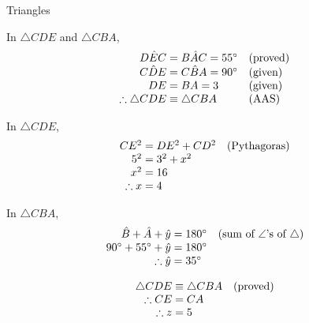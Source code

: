 \begin{wex}{Triangles}
{In $\triangle CDE$ and $\triangle CBA$,
\begin{equation*}
  \begin{array}{r@{\;}l@{\quad}l}
    D\hat{E}C &= B\hat{A}C = 55^{\circ} & \mbox{(proved)} \\
    C\hat{D}E &= C\hat{B}A = 90^{\circ} & \mbox{(given)} \\
           DE &= BA = 3                & \mbox{(given)} \\
    \therefore \triangle{CDE} &\equiv \triangle {CBA} & \mbox{(AAS)} 
  \end{array}
\end{equation*}

In $\triangle CDE$,
\begin{equation*}
  \begin{array}{r@{\;}l@{\quad}l}
    CE^{2} &= DE^{2} + CD^{2} & \mbox{(Pythagoras)} \\
    5^{2} &= 3^{2} + x^{2} &  \\
    x^{2} &= 16 & \\
    \therefore x &= 4 &
  \end{array}
\end{equation*}

In $\triangle CBA$,
\begin{equation*}
  \begin{array}{r@{\;}l@{\quad}l}
    \hat{B} + \hat{A} + \hat{y} &= 180^{\circ} & \mbox{(sum of $\angle$'s of $\triangle$)} \\
    90^{\circ} + 55^{\circ} + \hat{y} &= 180^{\circ} & \\
    \therefore \hat{y} &= 35^{\circ} &
  \end{array}
\end{equation*}

\begin{equation*}
  \begin{array}{r@{\;}l@{\quad}l}
    \triangle CDE &\equiv \triangle CBA & \mbox{(proved)} \\
    \therefore CE &= CA                 & \\
     \therefore z &= 5                  & 
  \end{array}
\end{equation*}
}
\end{wex}

